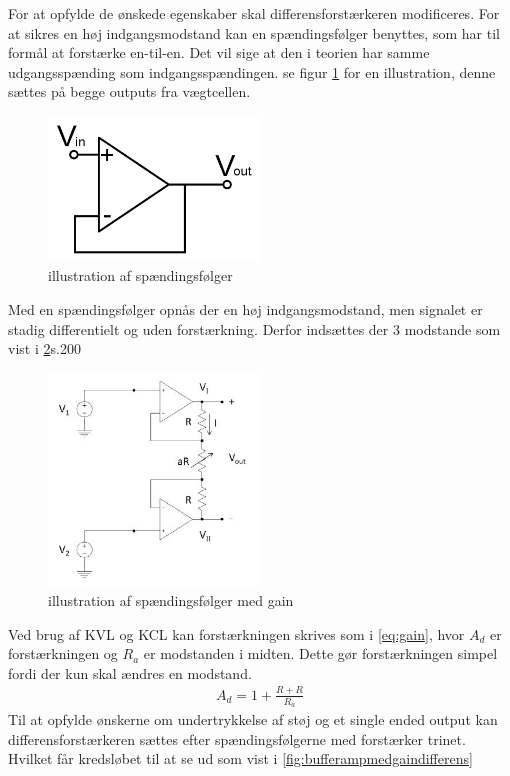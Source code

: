 For at opfylde de ønskede egenskaber skal differensforstærkeren modificeres. For at sikres en høj indgangsmodstand kan en spændingsfølger benyttes, som har til formål at forstærke en-til-en. Det vil sige at den i teorien har samme udgangsspænding som indgangsspændingen. se figur \ref{fig:bufferamp} for en illustration, denne sættes på begge outputs fra vægtcellen.
\begin{figure}[H]
	\centering
	\includegraphics[width=0.5\textwidth]{billeder/Hardware/bufferamp.png}
	\caption{illustration af spændingsfølger}
	\label{fig:bufferamp}
\end{figure}
Med en spændingsfølger opnås der en høj indgangsmodstand, men signalet er stadig differentielt og uden forstærkning. Derfor indsættes der 3 modstande som vist i \ref{fig:bufferampmedgain}\citep{ASBbog}s.200
\begin{figure}[H]
	\centering
	\includegraphics[width=0.5\textwidth]{billeder/Hardware/bufferampgain.JPG}
	\caption{illustration af spændingsfølger med gain}
	\label{fig:bufferampmedgain}
\end{figure}
Ved brug af KVL og KCL kan forstærkningen skrives som i \ref{eq:gain}, hvor $A_{d}$ er forstærkningen og $R_{a}$ er modstanden i midten. Dette gør forstærkningen simpel fordi der kun skal ændres en modstand. 
\begin{align}
 A_{d}=1+\frac{R+R}{R_{a}}
 \label{eq:gain}
 \end{align}
 Til at opfylde ønskerne om undertrykkelse af støj og et single ended output kan differensforstærkeren sættes efter spændingsfølgerne med forstærker trinet. Hvilket får kredsløbet til at se ud som vist i \ref{fig:bufferampmedgaindifferens}
 
